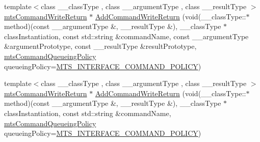 {\bf }\par
\begin{DoxyCompactItemize}
\item 
{\footnotesize template$<$class \+\_\+\+\_\+class\+Type , class \+\_\+\+\_\+argument\+Type , class \+\_\+\+\_\+result\+Type $>$ }\\\hyperlink{classmts_command_write_return}{mts\+Command\+Write\+Return} $\ast$ \hyperlink{classmts_interface_provided_aedfb9472863d9ae3b563adb964f2268b}{Add\+Command\+Write\+Return} (void(\+\_\+\+\_\+class\+Type\+::$\ast$method)(const \+\_\+\+\_\+argument\+Type \&, \+\_\+\+\_\+result\+Type \&), \+\_\+\+\_\+class\+Type $\ast$class\+Instantiation, const std\+::string \&command\+Name, const \+\_\+\+\_\+argument\+Type \&argument\+Prototype, const \+\_\+\+\_\+result\+Type \&result\+Prototype, \hyperlink{mts_forward_declarations_8h_aa2ac24035e136fa1689dcc2854c63fc7}{mts\+Command\+Queueing\+Policy} queueing\+Policy=\hyperlink{mts_forward_declarations_8h_aa2ac24035e136fa1689dcc2854c63fc7a4f444b4120a5e2efd084e2e5a214f5c8}{M\+T\+S\+\_\+\+I\+N\+T\+E\+R\+F\+A\+C\+E\+\_\+\+C\+O\+M\+M\+A\+N\+D\+\_\+\+P\+O\+L\+I\+C\+Y})
\item 
{\footnotesize template$<$class \+\_\+\+\_\+class\+Type , class \+\_\+\+\_\+argument\+Type , class \+\_\+\+\_\+result\+Type $>$ }\\\hyperlink{classmts_command_write_return}{mts\+Command\+Write\+Return} $\ast$ \hyperlink{classmts_interface_provided_aaedd4c0ebff3c980bddc2ceb1202caff}{Add\+Command\+Write\+Return} (void(\+\_\+\+\_\+class\+Type\+::$\ast$method)(const \+\_\+\+\_\+argument\+Type \&, \+\_\+\+\_\+result\+Type \&), \+\_\+\+\_\+class\+Type $\ast$class\+Instantiation, const std\+::string \&command\+Name, \hyperlink{mts_forward_declarations_8h_aa2ac24035e136fa1689dcc2854c63fc7}{mts\+Command\+Queueing\+Policy} queueing\+Policy=\hyperlink{mts_forward_declarations_8h_aa2ac24035e136fa1689dcc2854c63fc7a4f444b4120a5e2efd084e2e5a214f5c8}{M\+T\+S\+\_\+\+I\+N\+T\+E\+R\+F\+A\+C\+E\+\_\+\+C\+O\+M\+M\+A\+N\+D\+\_\+\+P\+O\+L\+I\+C\+Y})
\end{DoxyCompactItemize}

